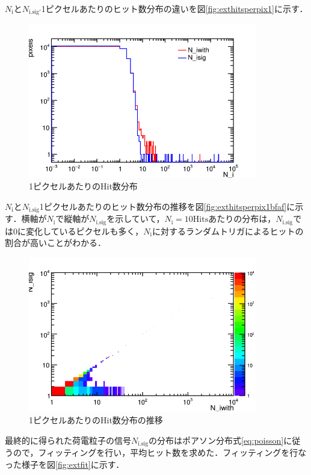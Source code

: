 $N_{\mathrm{i}}$と$N_{\mathrm{i.sig'}}$1ピクセルあたりのヒット数分布の違いを図\ref{fig:exthitsperpix1}に示す．
\begin{figure}[h]
  \centering
  \includegraphics[width=10cm]{./figure/exthitperpix.png}
  \caption{1ピクセルあたりのHit数分布}
  \label{fig:exthitfreq}
\end{figure}

$N_{\mathrm{i}}$と$N_{\mathrm{i.sig}}$1ピクセルあたりのヒット数分布の推移を図\ref{fig:exthitsperpix1bfaf}に示す．横軸が$N_{\mathrm{i}}$で縦軸が$N_{\mathrm{i.sig}}$を示していて，$N_{\mathrm{i}}=10 \mathrm{Hits}$あたりの分布は，$N_{\mathrm{i.sig}}$では0に変化しているピクセルも多く，$N_{\mathrm{i}}$に対するランダムトリガによるヒットの割合が高いことがわかる．
\begin{figure}[h]
  \centering
  \includegraphics[width=10cm]{./figure/exthitperpixbfaf.png}
  \caption{1ピクセルあたりのHit数分布の推移}
  \label{fig:exthitfreq}
\end{figure}

最終的に得られた荷電粒子の信号$N_{\mathrm{i.sig}}$の分布はポアソン分布式\ref{eq:poisson}に従うので，フィッティングを行い，平均ヒット数を求めた．フィッティングを行なった様子を図\ref{fig:extfit}に示す．

